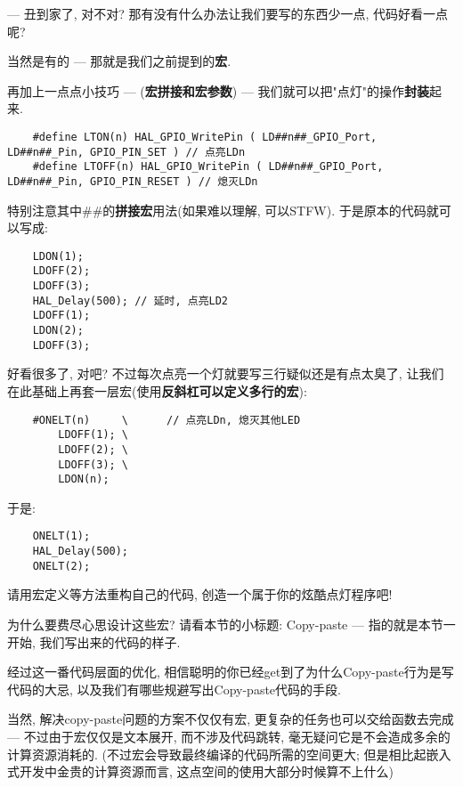 --- 丑到家了, 对不对? 那有没有什么办法让我们要写的东西少一点, 代码好看一点呢?

当然是有的 --- 那就是我们之前提到的\textbf{宏}.

再加上一点点小技巧 --- (\textbf{宏拼接和宏参数}) --- 我们就可以把"点灯"的操作\textbf{封装}起来.
\begin{lstlisting}
	#define LTON(n) HAL_GPIO_WritePin ( LD##n##_GPIO_Port, LD##n##_Pin, GPIO_PIN_SET ) // 点亮LDn
	#define LTOFF(n) HAL_GPIO_WritePin ( LD##n##_GPIO_Port, LD##n##_Pin, GPIO_PIN_RESET ) // 熄灭LDn
\end{lstlisting}

特别注意其中\#\#的\textbf{拼接宏}用法(如果难以理解, 可以STFW). 于是原本的代码就可以写成:
\begin{lstlisting}
	LDON(1);
	LDOFF(2);
	LDOFF(3);
	HAL_Delay(500); // 延时, 点亮LD2
	LDOFF(1);
	LDON(2);
	LDOFF(3);
\end{lstlisting}

好看很多了, 对吧? 不过每次点亮一个灯就要写三行疑似还是有点太臭了, 让我们在此基础上再套一层宏(使用\textbf{反斜杠可以定义多行的宏}):
\begin{lstlisting}
	#ONELT(n)     \      // 点亮LDn, 熄灭其他LED
		LDOFF(1); \
		LDOFF(2); \
		LDOFF(3); \
		LDON(n);
\end{lstlisting}

于是:
\begin{lstlisting}
	ONELT(1);
	HAL_Delay(500);
	ONELT(2);
\end{lstlisting}

\begin{theorem}
	请用宏定义等方法重构自己的代码, 创造一个属于你的炫酷点灯程序吧!
\end{theorem}

\begin{problem}
为什么要费尽心思设计这些宏? 请看本节的小标题: Copy-paste --- 指的就是本节一开始, 我们写出来的代码的样子.

经过这一番代码层面的优化, 相信聪明的你已经get到了为什么Copy-paste行为是写代码的大忌, 以及我们有哪些规避写出Copy-paste代码的手段.

当然, 解决copy-paste问题的方案不仅仅有宏, 更复杂的任务也可以交给函数去完成 --- 不过由于宏仅仅是文本展开, 而不涉及代码跳转, 毫无疑问它是不会造成多余的计算资源消耗的. (不过宏会导致最终编译的代码所需的空间更大; 但是相比起嵌入式开发中金贵的计算资源而言, 这点空间的使用大部分时候算不上什么)
\end{problem}


